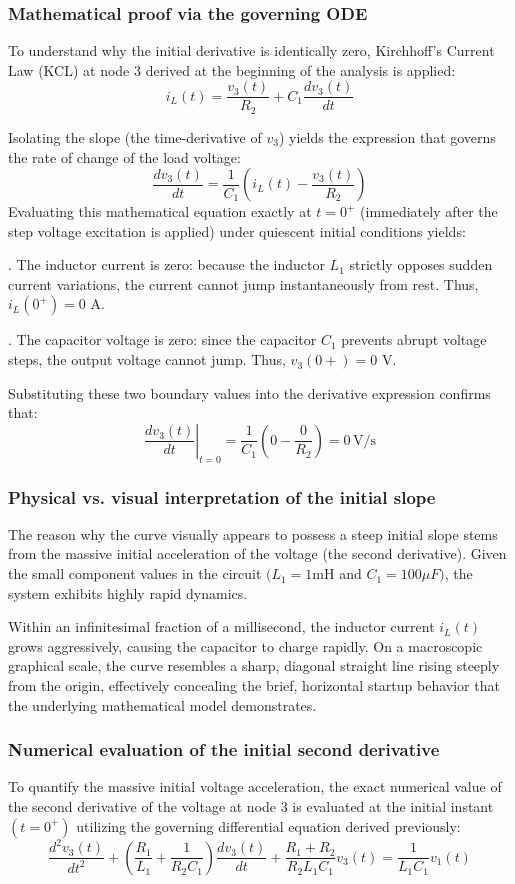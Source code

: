 \documentclass[energies,accept,oneauthor,pdftex]{Definitions/mdpi}
\begin{document}
\subsubsection*{Mathematical proof via the governing ODE}

To understand why the initial derivative is identically zero, Kirchhoff's Current Law (KCL) at node 3 derived at the beginning of the analysis is applied:
\[
i_L(t) = \frac{v_3(t)}{R_2} + C_1 \frac{dv_3(t)}{dt}
\]

Isolating the slope (the time-derivative of $v_3$) yields the expression that governs the rate of change of the load voltage:
\[
\frac{dv_3(t)}{dt} = \frac{1}{C_1 } \left(i_L(t) - \frac{v_3(t)}{R_2}\right)
\]
Evaluating this mathematical equation exactly at $t = 0^+$ (immediately after the step voltage excitation is applied) under quiescent initial conditions yields:

\medskip{}. The inductor current is zero: because the inductor $L_1$ strictly opposes sudden current variations, the current cannot jump instantaneously from rest. Thus, $i_L(0^+) = 0$ A.

\medskip{}. The capacitor voltage is zero: since the capacitor $C_1$ prevents abrupt voltage steps, the output voltage cannot jump. Thus, $v_3 (0+ ) = 0$ V.

Substituting these two boundary values into the derivative expression confirms that:
\[
\left.\frac{dv_3 (t)}{dt}\right|_{t=0}
 = \frac{1}{C_1}\left(0 - \frac{0}{R_2}\right) = 0\, \mathrm{V\!/s}
\]


\subsubsection*{Physical vs. visual interpretation of the initial slope}
The reason why the curve visually appears to possess a steep initial slope stems from the massive initial acceleration of the voltage (the second derivative). Given the small component values in the circuit $(L_1 = 1$mH and $C_1 = 100 \mu F)$, the system exhibits highly rapid dynamics.

Within an infinitesimal fraction of a millisecond, the inductor current $i_L(t)$ grows aggressively, causing the capacitor to charge rapidly. On a macroscopic graphical scale, the curve resembles a sharp, diagonal straight line rising steeply from the origin, effectively concealing the brief, horizontal startup behavior that the underlying mathematical model demonstrates.


\subsubsection*{Numerical evaluation of the initial second derivative}
To quantify the massive initial voltage acceleration, the exact numerical value of the second derivative of the voltage at node 3 is evaluated at the initial instant $(t = 0^+)$ utilizing the governing differential equation derived previously:
\[
\frac{d^2v_3(t)}{dt^2} + \left(\frac{R_1}{L_1} +\frac{1}{R_2C_1}\right)\frac{dv_3(t)}{dt} + \frac{R_1+R_2}{R_2L_1C_1}v_3(t) =  \frac{1}{L_1C_1}v_1(t)
\]
\end{document}
